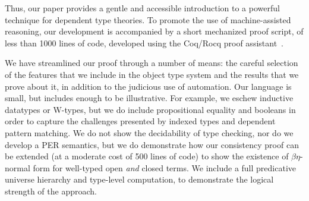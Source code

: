 \documentclass[acmsmall,screen=true,
\ifpublic review=false\else,review=true\fi
  ,anonymous=\ifanonymous true\else false\fi]{acmart}
\newcommand{\lang}{$\lambda^{U\mathbb{B}\ottkw{Id}}$\xspace}
\newcommand{\scw}[1]{}
\newcommand{\yl}[1]{}
\begin{document}
Thus, our paper provides a gentle and accessible introduction to a powerful
technique for dependent type theories. To promote the use of machine-assisted
reasoning, our development is accompanied by a short mechanized proof script,
of less than 1000 lines of code, developed using the Coq/Rocq proof
assistant~\cite{coq}.

We have streamlined our proof through a number of means: the careful selection
of the features that we include in the object type system and the results
that we prove about it, in addition to the judicious use of automation.  Our
language is small, but includes enough to be illustrative. For example, we
eschew inductive datatypes or W-types, but we do include propositional
equality and booleans in order to capture the challenges presented by indexed
types and dependent pattern matching. We do not show the decidability of type
checking, nor do we develop a PER semantics, but we do demonstrate how our
consistency proof can be extended (at a moderate cost of 500 lines of code) to
show the existence of $\beta\eta$-normal form for well-typed open \emph{and}
closed terms. We include a full predicative universe hierarchy and
type-level computation, to demonstrate the logical strength of the
approach. %
\end{document}

